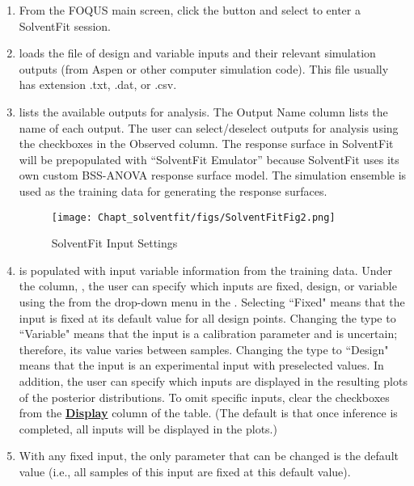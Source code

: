 \begin{enumerate}

\item {}  From the FOQUS main screen, click the  button and select  to enter a SolventFit session.

\item {} loads the file of design and variable inputs and their relevant simulation outputs (from Aspen or other computer simulation code).  This file usually has extension .txt, .dat, or .csv.

\item {} lists the available outputs for analysis.  The Output Name column lists the name of each output.  The user can select/deselect outputs for analysis using the checkboxes in the Observed column.  The response surface in SolventFit will be prepopulated with ``SolventFit Emulator'' because SolventFit uses its own custom BSS-ANOVA response surface model.  The simulation ensemble is used as the training data for generating the response surfaces.

\begin{figure}[h!]
\centering \texttt{[image: Chapt\_solventfit/figs/SolventFitFig2.png]}
\caption{SolventFit Input Settings}
\label{fig:SolventFit_Fig_2}
\end{figure}

\item  {} is populated with input variable information from the training data.  Under the column, , the user can specify which inputs are fixed, design, or variable using the from the drop-down menu in the .  Selecting ``Fixed" means that the input is fixed at its default value for all design points. Changing the type to ``Variable" means that the input is a calibration parameter and is uncertain; therefore, its value varies between samples.   Changing the type to ``Design" means that the input is an experimental input with preselected values.  In addition, the user can specify which inputs are displayed in the resulting plots of the posterior distributions.  To omit specific inputs, clear the checkboxes from the \textbf{\underline{Display}} column of the table.  (The default is that once inference is completed, all inputs will be displayed in the plots.)   

\item {} With any fixed input, the only parameter that can be changed is the default value (i.e., all samples of this input are fixed at this default value). 


\end{enumerate}
